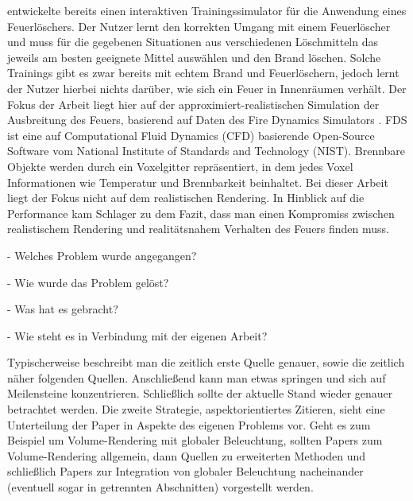 \parencite{Schlager2017} entwickelte bereits einen interaktiven Trainingssimulator für die Anwendung eines Feuerlöschers.
Der Nutzer lernt den korrekten Umgang mit einem Feuerlöscher und muss für die gegebenen Situationen aus verschiedenen Löschmitteln das
jeweils am besten geeignete Mittel auswählen und den Brand löschen.
Solche Trainings gibt es zwar bereits mit echtem Brand und Feuerlöschern, jedoch lernt der Nutzer hierbei nichts darüber,
wie sich ein Feuer in Innenräumen verhält.
Der Fokus der Arbeit liegt hier auf der approximiert-realistischen Simulation der Ausbreitung des Feuers,
basierend auf Daten des Fire Dynamics Simulators \parencite{FDS2004}.
FDS ist eine auf Computational Fluid Dynamics (CFD) basierende Open-Source Software vom National Institute of Standards and Technology (NIST).
Brennbare Objekte werden durch ein Voxelgitter repräsentiert, in dem jedes Voxel Informationen wie Temperatur und Brennbarkeit beinhaltet.
Bei dieser Arbeit liegt der Fokus nicht auf dem realistischen Rendering.
In Hinblick auf die Performance kam Schlager zu dem Fazit, dass man einen Kompromiss zwischen realistischem Rendering und 
realitätsnahem Verhalten des Feuers finden muss.



    - Welches Problem wurde angegangen?

    - Wie wurde das Problem gelöst?

    - Was hat es gebracht?

    - Wie steht es in Verbindung mit der eigenen Arbeit?



Typischerweise beschreibt man die zeitlich erste Quelle genauer, sowie die zeitlich näher folgenden Quellen. 
Anschließend kann man etwas springen und sich
auf Meilensteine konzentrieren. Schließlich sollte der aktuelle Stand wieder genauer betrachtet werden. 
Die zweite Strategie, aspektorientiertes Zitieren, sieht eine Unterteilung der Paper in Aspekte des
eigenen Problems vor. Geht es zum Beispiel um Volume-Rendering mit globaler Beleuchtung, sollten
Papers zum Volume-Rendering allgemein, dann Quellen zu erweiterten Methoden und schließlich Papers 
zur Integration von globaler Beleuchtung nacheinander (eventuell sogar in getrennten Abschnitten)
vorgestellt werden.
